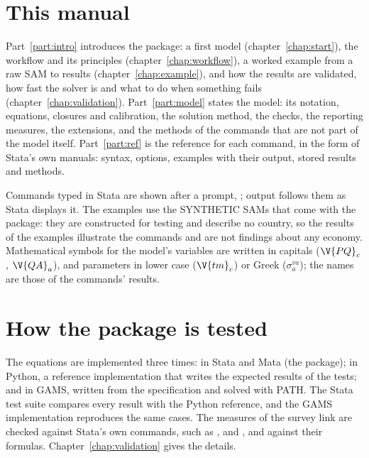 \section{This manual}

Part~\ref{part:intro} introduces the package: a first model
(chapter~\ref{chap:start}), the workflow and its principles
(chapter~\ref{chap:workflow}), a worked example from a raw SAM to results
(chapter~\ref{chap:example}), and how the results are validated, how fast the
solver is and what to do when something fails (chapter~\ref{chap:validation}).
Part~\ref{part:model} states the model: its notation, equations, closures and
calibration, the solution method, the checks, the reporting measures, the
extensions, and the methods of the commands that are not part of the model
itself. Part~\ref{part:ref} is the reference for each command, in the form of
Stata's own manuals: syntax, options, examples with their output, stored
results and methods.

Commands typed in Stata are shown after a prompt, ; output
follows them as Stata displays it. The examples use the SYNTHETIC SAMs that come
with the package: they are constructed for testing and describe no country, so
the results of the examples illustrate the commands and are not findings about
any economy. Mathematical symbols for the model's variables are written in
capitals ($\V{PQ}_c$, $\V{QA}_a$), and parameters in lower case ($\V{tm}_c$) or
Greek ($\sigma^{va}_a$); the names are those of the commands' results.

\section{How the package is tested}

The equations are implemented three times: in Stata and Mata (the package); in
Python, a reference implementation that writes the expected results of the
tests; and in GAMS, written from the specification and solved with PATH. The
Stata test suite compares every result with the Python reference, and the GAMS
implementation reproduces the same cases. The measures of the survey link are
checked against Stata's own commands, such as ,  and
, and against their formulas. Chapter~\ref{chap:validation} gives
the details.
